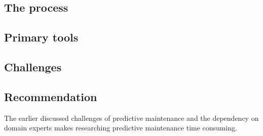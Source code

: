 \subsection{The process}

\subsection{Primary tools}

\subsection{Challenges}

\subsection{Recommendation}
The earlier discussed challenges of predictive maintenance and the dependency on domain experts makes researching predictive maintenance time consuming. 